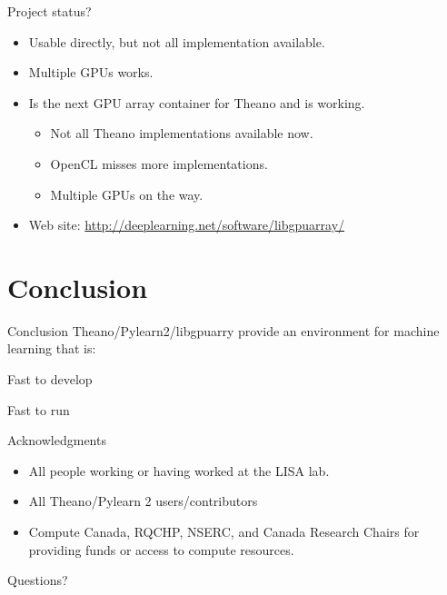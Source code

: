 \documentclass[utf8x,xcolor=pdftex,dvipsnames,table]{beamer}
\begin{document}
\begin{frame}{Project status?}
  \begin{itemize}
  \item Usable directly, but not all implementation available.
  \item Multiple GPUs works.
  \item Is the next GPU array container for Theano and is working.
    \begin{itemize}
    \item Not all Theano implementations available now.
    \item OpenCL misses more implementations.
    \item Multiple GPUs on the way.
    \end{itemize}
  \item Web site: \url{http://deeplearning.net/software/libgpuarray/}
  \end{itemize}
\end{frame}

\section{Conclusion}
\begin{frame}
  \tableofcontents[currentsection]
\end{frame}

\begin{frame}{Conclusion}
Theano/Pylearn2/libgpuarry provide an environment for machine learning that is:
\begin{bf}Fast to develop\end{bf}\newline
\begin{bf}Fast to run\end{bf}\newline
\end{frame}

\begin{frame}{Acknowledgments}
\begin{itemize}
\item All people working or having worked at the LISA lab.
\item All Theano/Pylearn 2 users/contributors
\item Compute Canada, RQCHP, NSERC, and Canada Research Chairs for providing funds or access to compute resources.
\end{itemize}
\end{frame}

\begin{frame}
\begin{center}
\Huge
Questions?
\end{center}
\end{frame}
\end{document}
